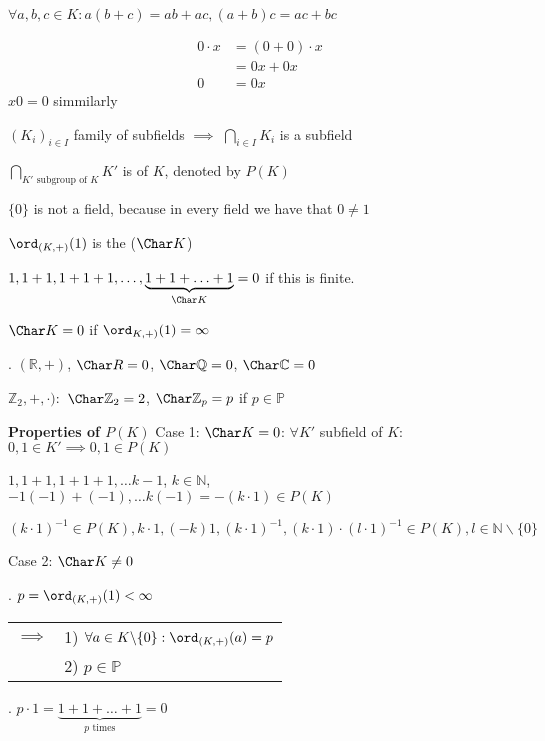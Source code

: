 $\forall a,b,c \in K: a(b+c) = ab+ac, (a+b)c = ac+bc$

\begin{align*}
  0\cdot x &= (0+0) \cdot x \\
           &= 0x + 0x \\
         0 &= 0x
\end{align*}
$x0 = 0$ simmilarly

$(K_i)_{i\in I}$ family of subfields $\implies$ $\bigcap_{i\in I} K_i$ is a subfield

\begin{definition}
  $\bigcap_{K' \text{ subgroup of $K$}} K'$ is  of $K$, denoted by $P(K)$
\end{definition}

$\{0\}$ is not a field, because in every field we have that $0 \neq 1$

\begin{definition}
  $\ord_{(K,+)} (1)$ is the  ($\Char K$)
\end{definition}

$1,1+1, 1+1+1, \ldots, \underbrace{1+1+ \ldots +1}_{\Char K} = 0$ if this is finite.

$\Char K = 0$ if $\ord_{K,+)} (1) = \infty$

\Example.
$(\mathbb{R}, +)$, $\Char R = 0$, $\Char \mathbb{Q} = 0$, $\Char \mathbb{C} = 0$

$\mathbb{Z}_2, +, \cdot): $ $\Char \mathbb{Z}_2 = 2$, $\Char \mathbb{Z}_p = p$ if $p \in \mathbb{P}$

\textbf{Properties of $P(K)$}
Case 1: 
$\Char K=0$: 
$\forall K'$ subfield of $K$: $0,1 \in K' \implies 0,1 \in P(K)$

$1,1+1, 1+1+1, \ldots k-1$, $k \in \mathbb{N}$, $-1(-1)+(-1), \ldots k(-1) = -(k\cdot 1) \in P(K)$

$(k\cdot 1)^{-1} \in P(K), k\cdot 1, (-k)1,(k\cdot 1)^{-1}, (k\cdot 1)\cdot (l\cdot 1)^{-1} \in P(K), l \in \mathbb{N} \backslash \{0\}$


Case 2: $\Char K \neq 0$

\Lemma.
$p = \ord_{(K,+)} (1) < \infty$
\begin{tabular}{ll}
$\implies$
  & 1) $\forall a \in K \backslash \{0\}: \ord_{(K,+)} (a) = p$\\
  & 2) $p \in \mathbb{P}$
\end{tabular}

\Proof.
$p\cdot 1 = \underbrace{1+1+ \ldots +1}_{p \text{ times}} = 0$

